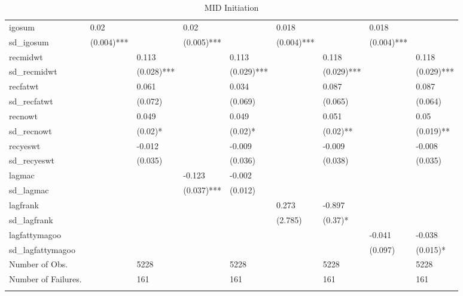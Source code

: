 \begin{table}[ht]
\begin{tabular}{lllllllll}
  igosum & 0.02 &  & 0.02 &  & 0.018 &  & 0.018 &  \\ 
  sd\_igosum & (0.004)*** &  & (0.005)*** &  & (0.004)*** &  & (0.004)*** &  \\ 
  recmidwt &  & 0.113 &  & 0.113 &  & 0.118 &  & 0.118 \\ 
  sd\_recmidwt &  & (0.028)*** &  & (0.029)*** &  & (0.029)*** &  & (0.029)*** \\ 
  recfatwt &  & 0.061 &  & 0.034 &  & 0.087 &  & 0.087 \\ 
  sd\_recfatwt &  & (0.072)  &  & (0.069)  &  & (0.065)  &  & (0.064)  \\ 
  recnowt &  & 0.049 &  & 0.049 &  & 0.051 &  & 0.05 \\ 
  sd\_recnowt &  & (0.02)* &  & (0.02)* &  & (0.02)** &  & (0.019)** \\ 
  recyeswt &  & -0.012 &  & -0.009 &  & -0.009 &  & -0.008 \\ 
  sd\_recyeswt &  & (0.035)  &  & (0.036)  &  & (0.038)  &  & (0.035)  \\ 
  lagmac &  &  & -0.123 & -0.002 &  &  &  &  \\ 
  sd\_lagmac &  &  & (0.037)*** & (0.012)  &  &  &  &  \\ 
  lagfrank &  &  &  &  & 0.273 & -0.897 &  &  \\ 
  sd\_lagfrank &  &  &  &  & (2.785)  & (0.37)* &  &  \\ 
  lagfattymagoo &  &  &  &  &  &  & -0.041 & -0.038 \\ 
  sd\_lagfattymagoo &  &  &  &  &  &  & (0.097)  & (0.015)* \\ 
  Number of Obs. &  & 5228 &  & 5228 &  & 5228 &  & 5228 \\ 
  Number of Failures. &  & 161 &  & 161 &  & 161 &  & 161 \\ 
   \hline \footnotesize{  }
\end{tabular}
\caption{MID Initiation} 
\end{table}
